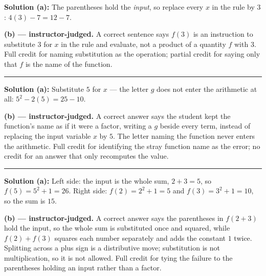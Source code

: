 \documentclass[12pt]{article}
\begin{document}



\textbf{Solution (a):} The parentheses hold the \emph{input}, so replace every $x$ in the rule by $3$: $4(3) - 7 = 12 - 7$. 

\textbf{(b) --- instructor-judged.} A correct sentence says $f(3)$ is an instruction to substitute $3$ for $x$ in the rule and evaluate, not a product of a quantity $f$ with $3$. Full credit for naming substitution as the operation; partial credit for saying only that $f$ is the name of the function.

\vspace{0.2cm}\noindent\rule{\linewidth}{0.2pt}


\textbf{Solution (a):} Substitute $5$ for $x$ --- the letter $g$ does not enter the arithmetic at all: $5^2 - 2(5) = 25 - 10$. 

\textbf{(b) --- instructor-judged.} A correct answer says the student kept the function's name as if it were a factor, writing a $g$ beside every term, instead of replacing the input variable $x$ by $5$. The letter naming the function never enters the arithmetic. Full credit for identifying the stray function name as the error; no credit for an answer that only recomputes the value.

\vspace{0.2cm}\noindent\rule{\linewidth}{0.2pt}


\textbf{Solution (a):} Left side: the input is the whole sum, $2 + 3 = 5$, so $f(5) = 5^2 + 1 = 26$. Right side: $f(2) = 2^2 + 1 = 5$ and $f(3) = 3^2 + 1 = 10$, so the sum is $15$. 

\textbf{(b) --- instructor-judged.} A correct answer says the parentheses in $f(2+3)$ hold the input, so the whole sum is substituted once and squared, while $f(2) + f(3)$ squares each number separately and adds the constant $1$ twice. Splitting across a plus sign is a distributive move; substitution is not multiplication, so it is not allowed. Full credit for tying the failure to the parentheses holding an input rather than a factor.
\end{document}
